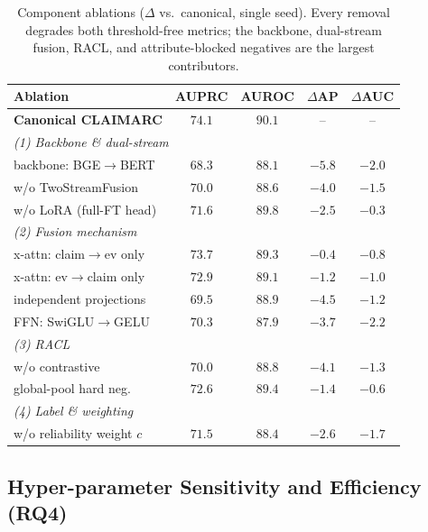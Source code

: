 \begin{table}[t]
\centering\small
\setlength{\tabcolsep}{5pt}
\begin{tabular}{lcccc}
\toprule
\textbf{Ablation} & \textbf{AUPRC} & \textbf{AUROC} & \textbf{$\Delta$AP} & \textbf{$\Delta$AUC} \\
\midrule
\textbf{Canonical CLAIMARC}     & $\mathbf{74.1}$ & $\mathbf{90.1}$ & -- & -- \\
\midrule
\multicolumn{5}{l}{\textit{(1) Backbone \& dual-stream}}\\
\quad backbone: BGE$\to$BERT    & $68.3$ & $88.1$ & $-5.8$ & $-2.0$ \\
\quad w/o TwoStreamFusion       & $70.0$ & $88.6$ & $-4.0$ & $-1.5$ \\
\quad w/o LoRA (full-FT head)   & $71.6$ & $89.8$ & $-2.5$ & $-0.3$ \\
\midrule
\multicolumn{5}{l}{\textit{(2) Fusion mechanism}}\\
\quad x-attn: claim$\to$ev only & $73.7$ & $89.3$ & $-0.4$ & $-0.8$ \\
\quad x-attn: ev$\to$claim only & $72.9$ & $89.1$ & $-1.2$ & $-1.0$ \\
\quad independent projections   & $69.5$ & $88.9$ & $-4.5$ & $-1.2$ \\
\quad FFN: SwiGLU$\to$GELU      & $70.3$ & $87.9$ & $-3.7$ & $-2.2$ \\
\midrule
\multicolumn{5}{l}{\textit{(3) RACL}}\\
\quad w/o contrastive           & $70.0$ & $88.8$ & $-4.1$ & $-1.3$ \\
\quad global-pool hard neg.     & $72.6$ & $89.4$ & $-1.4$ & $-0.6$ \\
\midrule
\multicolumn{5}{l}{\textit{(4) Label \& weighting}}\\
\quad w/o reliability weight $c$ & $71.5$ & $88.4$ & $-2.6$ & $-1.7$ \\
\bottomrule
\end{tabular}
\caption{Component ablations ($\Delta$ vs.\ canonical, single seed). Every
removal degrades both threshold-free metrics; the backbone, dual-stream fusion,
RACL, and attribute-blocked negatives are the largest contributors.}
\label{tab:abl}
\end{table}

\subsection{Hyper-parameter Sensitivity and Efficiency (RQ4)}
\label{sec:exp:hyper}

